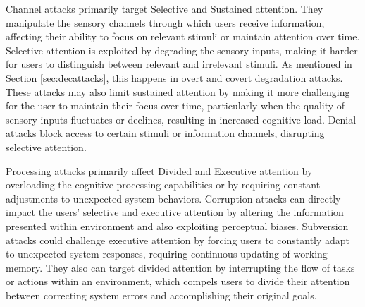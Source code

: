 Channel attacks primarily target Selective and Sustained attention. 
They manipulate the sensory channels through which users receive information, affecting their ability to focus on relevant stimuli or maintain attention over time.
Selective attention is exploited by degrading the sensory inputs, making it harder for users to distinguish between relevant and irrelevant stimuli. As mentioned in Section \ref{sec:decattacks}, this happens in overt and covert degradation attacks. These attacks may also limit sustained attention by making it more challenging for the user to maintain their focus over time, particularly when the quality of sensory inputs fluctuates or declines, resulting in increased cognitive load. 
Denial attacks block access to certain stimuli or information channels, disrupting selective attention. 

Processing attacks primarily affect Divided and Executive attention by overloading the cognitive processing capabilities or by requiring constant adjustments to unexpected system behaviors.
Corruption attacks %
can directly impact the users' selective and executive attention by altering the information presented within \MR environment and also exploiting perceptual biases.
Subversion attacks could challenge executive attention by forcing users to constantly adapt to unexpected system responses, requiring continuous updating of working memory. They also can target divided attention by interrupting the flow of tasks or actions within an \MR environment, which compels users to divide their attention between correcting system errors and accomplishing their original goals.

\vspace{-1ex}

